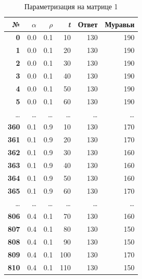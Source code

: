 \documentclass[a4paper,12pt]{article}
\begin{document}
\begin{table} [h!]
\begin{center}
\caption{Параметризация на матрице 1}
\begin{tabular}{|r|r|r|r|r|r|}
\hline
   {\bf №} & {\bf $\alpha$} &  {\bf $\rho$} &    {\bf \textit{t}} & {\bf Ответ} & {\bf Муравьи} \\
\hline
   {\bf 0} &        0.0 &        0.1 &       10 &        130 &        190 \\
\hline
   {\bf 1} &        0.0 &        0.1 &       20 &        130 &        190 \\
\hline
   {\bf 2} &        0.0 &        0.1 &       30 &        130 &        190 \\
\hline
   {\bf 3} &        0.0 &        0.1 &       40 &        130 &        190 \\
\hline
   {\bf 4} &        0.0 &        0.1 &       50 &        130 &        190 \\
\hline
   {\bf 5} &        0.0 &        0.1 &       60 &        130 &        190 \\
\hline
\ldots & \ldots & \ldots & \ldots & \ldots & \ldots\\
\hline
 {\bf 360} &        0.1 &        0.9 &       10 &        130 &        170 \\
\hline
 {\bf 361} &        0.1 &        0.9 &       20 &        130 &        170 \\
\hline
 {\bf 362} &        0.1 &        0.9 &       30 &        130 &        160 \\
\hline
 {\bf 363} &        0.1 &        0.9 &       40 &        130 &        160 \\
\hline
 {\bf 364} &        0.1 &        0.9 &       50 &        130 &        160 \\
\hline
 {\bf 365} &        0.1 &        0.9 &       60 &        130 &        170 \\
\hline
\ldots & \ldots & \ldots & \ldots & \ldots & \ldots\\
\hline
 {\bf 806} &        0.4 &        0.1 &       70 &        130 &        160 \\
\hline
 {\bf 807} &        0.4 &        0.1 &       80 &        130 &        150 \\
\hline
 {\bf 808} &        0.4 &        0.1 &       90 &        130 &        150 \\
\hline
 {\bf 809} &        0.4 &        0.1 &      100 &        130 &        170 \\
\hline
 {\bf 810} &        0.4 &        0.1 &      110 &        130 &        150 \\

\end{tabular}
\end{center}
\end{table}
\end{document}
